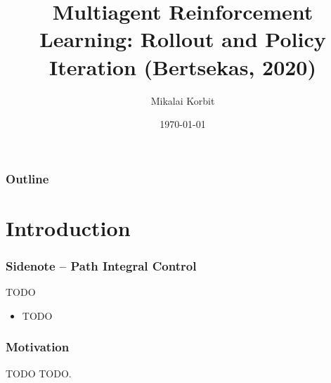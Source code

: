 \documentclass{beamer}
\title[MARL]{Multiagent Reinforcement Learning:
	Rollout and Policy Iteration
	(Bertsekas, 2020)}
\author{Mikalai Korbit} %
\institute[IMT] %
{
IMT School for Advanced Studies Lucca %
}
\date{\today} %
\begin{document}
\begin{frame}
\titlepage %
\end{frame}

\begin{frame}
\frametitle{Outline} %
\tableofcontents %
\end{frame}





\section{Introduction} 

\begin{frame}
	
\frametitle{Sidenote -- Path Integral Control}
TODO

\begin{itemize}
\item TODO

\end{itemize}

\end{frame}



\begin{frame}
\frametitle{Motivation}

\begin{block}{TODO}
TODO. 
\end{block}


\end{frame}


\end{document}
